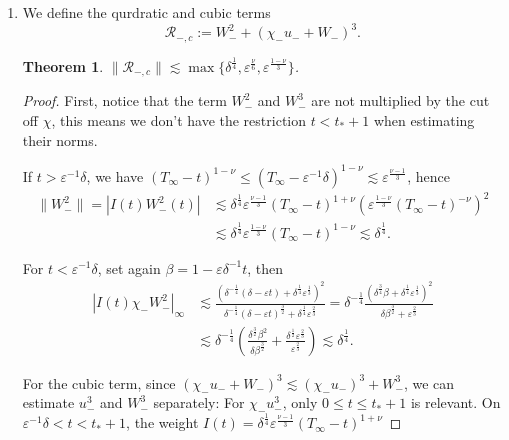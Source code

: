 \documentclass[letterpaper,11pt]{article}
\newcommand{\eps}{\varepsilon}
\newcommand{\lar}{ \lesssim }
\numberwithin{equation}{section}
\theoremstyle{plain}
\newtheorem{theorem}{Theorem}[section]
\begin{document}
\begin{enumerate}
\begin{itemize}
\begin{enumerate}
\item  We define the qurdratic and cubic terms
\[
\mathcal{R}_{-,c}:= W_-^2 +(\chi_- u_- +W_-)^3.
\]

\begin{theorem} \label{R_-,c est}
$\|\mathcal{R}_{-,c}\| \lar \max\{ \delta^{\frac{1}{4}},\eps^{\frac{\nu}{6}}, \eps^{\frac{1-\nu}{3}}\}$.
\end{theorem}

\begin{proof}
First, notice that the term $W_-^2$ and $W_-^3$ are not multiplied by the cut off $\chi$, this means we don't have the restriction $t<t_*+1$ when estimating their norms.

If $t > \eps^{-1}\delta$, we have $(T_\infty -t )^{1-\nu} \le (T_\infty - \eps^{-1}\delta)^{1-\nu} \lar \eps^{\frac{\nu-1}{3}}$, hence 
\begin{align*}
\|W_-^2\| = |I(t) W_-^2(t) | &\lar \delta^{\frac{1}{4}} \eps^{\frac{\nu-1}{3}}(T_\infty - t)^{1+\nu}\left( \eps^{\frac{1-\nu}{3}}(T_\infty - t)^{-\nu}\right)^2\\ & \lar \delta^{\frac{1}{4}} \eps^{\frac{1-\nu}{3}}(T_\infty-t)^{1-\nu} \lar \delta^{\frac{1}{4}}.
\end{align*} 

For $t < \eps^{-1}\delta$, set again $\beta = 1-\eps \delta^{-1}t$, then
\begin{align*}
|I(t)\chi_-  W_-^2|_\infty &\lar \frac{ \left( \delta^{-\frac{1}{4}}(\delta-\eps t)+\delta^{\frac{1}{4}}\eps^{\frac{1}{3}} \right)^2}{\delta^{-\frac{1}{4}}(\delta-\eps t)^{\frac{3}{2}}+\delta^{\frac{1}{4}}\eps^{\frac{2}{3}} } = \delta^{-\frac{1}{4}}\frac{\left( \delta^{\frac{3}{4}}\beta+\delta^{\frac{1}{4}}\eps^{\frac{1}{3}} \right)^2 }{\delta\beta^{\frac{3}{2}}+\eps^{\frac{2}{3}}} \\
& \lar \delta^{-\frac{1}{4}} \left(\frac{\delta^{\frac{3}{2}}\beta^2}{\delta\beta^{\frac{3}{2}}} + \frac{\delta^{\frac{1}{2}}\eps^{\frac{2}{3}}}{\eps^{\frac{2}{3}}} \right) \lar \delta^{\frac{1}{4}}.
\end{align*}



For the cubic term, since $(\chi_-u_-+W_-)^3 \lar (\chi_-u_-)^3+W_-^3$, we can estimate $u_-^3$ and $W_-^3$ separately:
For $\chi_-u_-^3$, only $0 \le t \le t_*+1$ is relevant. On $\eps^{-1}\delta<t<t_*+1$, the weight $I(t) = \delta^{\frac{1}{4}}\eps^{\frac{\nu-1}{3}}(T_\infty-t)^{1+\nu}$



\end{proof}
\end{enumerate}
\end{itemize}
\end{enumerate}
\end{document}
